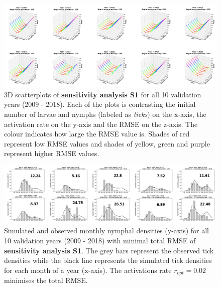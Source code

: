 \documentclass[a4paper, 11pt]{scrartcl}
\begin{document}
\begin{figure}
\centering
\includegraphics[width=\linewidth]{figures/initial_ticks_with_beech_error.png}
\caption{3D scatterplots of \textbf{sensitivity analysis S1} for all 10 validation years (2009 - 2018). Each of the plots is contrasting the initial number of larvae and nymphs
(labeled as \textit{ticks}) on the x-axis, the activation rate on the y-axis and the RMSE on the z-axis. The colour indicates how large the RMSE value is. Shades of
red represent low RMSE values and shades of yellow, green and purple represent higher RMSE values.}
\label{fig:initial_ticks_with_beech_error_rotated}
\end{figure}

\begin{figure}
\centering
\includegraphics[width=\linewidth]{figures/initial_ticks_with_beech.png}
\caption{Simulated and observed monthly nymphal densities (y-axis) for all 10 validation years (2009 - 2018) with minimal total RMSE of \textbf{sensitivity analysis S1}. The grey
bars represent the observed tick densities while the black line represents the simulated tick densities for each month of a year (x-axis). The activations rate $r_{opt} = 0.02$
minimises the total RMSE.}
\label{fig:initial_ticks_with_beech_rotated}
\end{figure}
\end{document}
